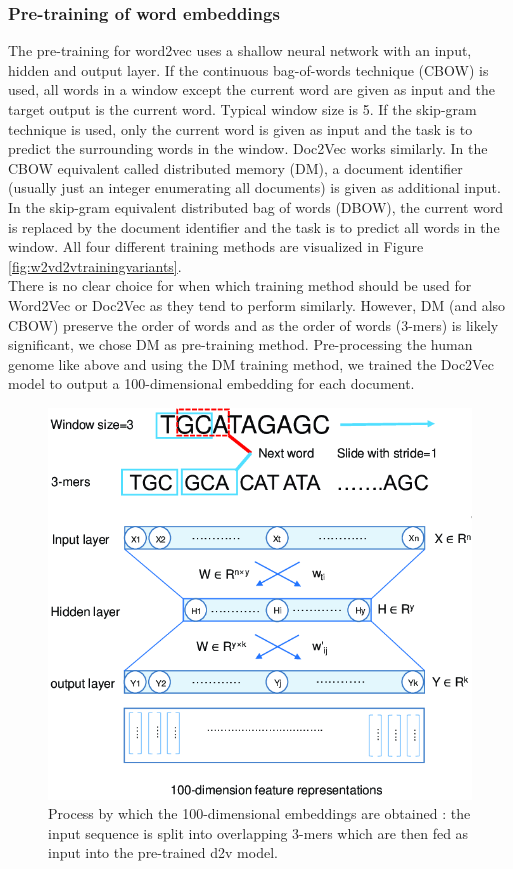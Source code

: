 \subsubsection{Pre-training of word embeddings}
The pre-training for word2vec uses a shallow neural network with an input, hidden and output layer. If the continuous bag-of-words technique (CBOW) is used, all words in a window except the current word are given as input and the target output is the current word. Typical window size is 5. %
If the skip-gram technique is used, only the current word is given as input and the task is to predict the surrounding words in the window. Doc2Vec works similarly. In the CBOW equivalent called distributed memory (DM), a document identifier (usually just an integer enumerating all documents) is given as additional input. In the skip-gram equivalent distributed bag of words (DBOW), the current word is replaced by the document identifier and the task is to predict all words in the window. All four different training methods are visualized in Figure \ref{fig:w2vd2vtrainingvariants}.\\
There is no clear choice for when which training method should be used for Word2Vec or Doc2Vec as they tend to perform similarly. However, DM (and also CBOW) preserve the order of words and as the order of words (3-mers) is likely significant, we chose DM as pre-training method.
Pre-processing the human genome like above and using the DM training method, we trained the Doc2Vec model to output a 100-dimensional embedding for each document.
\begin{figure}
	\centering\includegraphics[width=1\textwidth]{../visualizations/ch4-methods/d2v_training_cropped.png} 
	\caption{
		Process by which the 100-dimensional embeddings are obtained \cite{d2vsplicing}: the input sequence is split into overlapping 3-mers which are then fed as input into the pre-trained d2v model. 
	}
	\label{fig:d2vtraining}
\end{figure}


